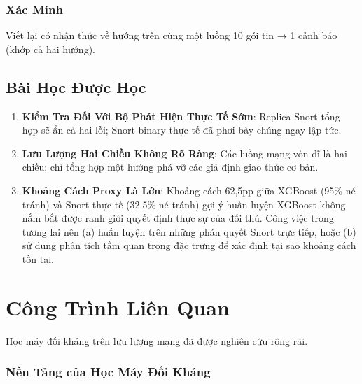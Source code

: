 \documentclass[12pt,a4paper]{report}
\begin{document}
\subsection{Xác Minh}
Viết lại có nhận thức về hướng trên cùng một luồng 10 gói tin → 1 cảnh báo (khớp cả hai hướng).

\section{Bài Học Được Học}

\begin{enumerate}
  \item \textbf{Kiểm Tra Đối Với Bộ Phát Hiện Thực Tế Sớm}: Replica Snort tổng hợp sẽ ẩn cả hai lỗi; Snort binary thực tế đã phơi bày chúng ngay lập tức.
  
  \item \textbf{Lưu Lượng Hai Chiều Không Rõ Ràng}: Các luồng mạng vốn dĩ là hai chiều; chỉ tổng hợp một hướng phá vỡ các giả định giao thức cơ bản.
  
  \item \textbf{Khoảng Cách Proxy Là Lớn}: Khoảng cách 62,5pp giữa XGBoost (95\% né tránh) và Snort thực tế (32.5\% né tránh) gợi ý huấn luyện XGBoost không nắm bắt được ranh giới quyết định thực sự của đối thủ. Công việc trong tương lai nên (a) huấn luyện trên những phán quyết Snort trực tiếp, hoặc (b) sử dụng phân tích tầm quan trọng đặc trưng để xác định tại sao khoảng cách tồn tại.
\end{enumerate}

\chapter{Công Trình Liên Quan}

Học máy đối kháng trên lưu lượng mạng đã được nghiên cứu rộng rãi.

\subsection{Nền Tảng của Học Máy Đối Kháng}
\end{document}
